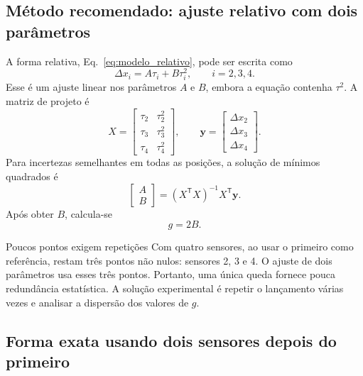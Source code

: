 \documentclass[11pt,a4paper]{article}
\newcommand{\vet}[1]{\bm{#1}}
\begin{document}
\subsection{Método recomendado: ajuste relativo com dois parâmetros}

A forma relativa, Eq.~\eqref{eq:modelo_relativo}, pode ser escrita como
\begin{equation}
  \Delta x_i=A\tau_i+B\tau_i^2,
  \qquad i=2,3,4.
  \label{eq:ajuste_dois_parametros}
\end{equation}
Esse é um ajuste linear nos parâmetros $A$ e $B$, embora a equação contenha $\tau^2$. A matriz de projeto é
\begin{equation}
  X=
  \begin{bmatrix}
    \tau_2 & \tau_2^2 \\
    \tau_3 & \tau_3^2 \\
    \tau_4 & \tau_4^2
  \end{bmatrix},
  \qquad
  \vet y=
  \begin{bmatrix}
    \Delta x_2 \\
    \Delta x_3 \\
    \Delta x_4
  \end{bmatrix}.
\end{equation}
Para incertezas semelhantes em todas as posições, a solução de mínimos quadrados é
\begin{equation}
  \begin{bmatrix} A \\ B \end{bmatrix}
  =\left(X^{\mathsf T}X\right)^{-1}X^{\mathsf T}\vet y.
\end{equation}
Após obter $B$, calcula-se
\begin{equation}
  \boxed{g=2B.}
\end{equation}

\begin{caixaCuidado}{Poucos pontos exigem repetições}
Com quatro sensores, ao usar o primeiro como referência, restam três pontos não nulos: sensores 2, 3 e 4. O ajuste de dois parâmetros usa esses três pontos. Portanto, uma única queda fornece pouca redundância estatística. A solução experimental é repetir o lançamento várias vezes e analisar a dispersão dos valores de $g$.
\end{caixaCuidado}

\subsection{Forma exata usando dois sensores depois do primeiro}
\end{document}
